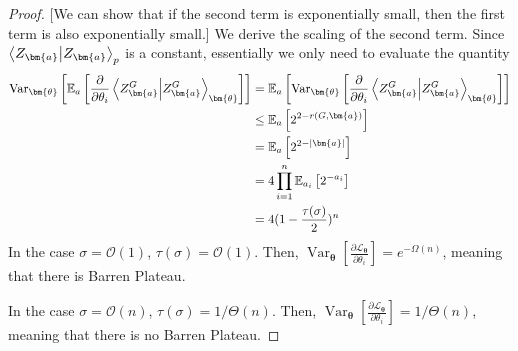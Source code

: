 \documentclass[a4paper,onecolumn,notitlepage,nofootinbib,longbibliography,superscriptaddress, floatfix, pra, aps, 10pt]{revtex4-2}
\newcommand{\cmt}[1]{{\color{blue}[#1]}}
\newcommand{\vttheta}{{\bm{\theta}}}
\newcommand{\vta}{{\bm{a}}}
\begin{document}
\begin{proof}
\cmt{We can show that if the second term is exponentially small, then the first term is also exponentially small.}
We derive the scaling of the second term. Since $\braket{Z_\vta}_p$ is a constant, essentially we only need to evaluate the quantity \begin{align}
    \operatorname{Var}_\vttheta \left[\mathbb{E}_a\left[\frac{\partial}{\partial \theta_i} \braket{Z^G_\vta}_\vttheta \right]
 \right] &= \mathbb{E}_a\left[\operatorname{Var}_\vttheta \left[\frac{\partial}{\partial \theta_i} \braket{Z^G_\vta}_\vttheta \right]
 \right]  \label{variance 1: eq}\\
 & \leq \mathbb{E}_a \left[2^{2-r(G,\vta)} \right] \label{variance 2: eq}\\
 & = \mathbb{E}_a \left[2^{2-\abs{\vta}} \right] \\
 & = 4 \prod_{i=1}^{n} \mathbb{E}_{a_i}\left[2^{-a_i} \right] \\
 & = 4 (1-\frac{\tau(\sigma)}{2})^n
\end{align}
In the case $\sigma = \mathcal{O}(1)$, $\tau(\sigma) = \mathcal{O}(1)$. Then, $\operatorname{Var}_\vttheta \left[\frac{\partial \mathcal{L}_\vttheta}{\partial \theta_i}\right] = e^{-\Omega(n)}$, meaning that there is Barren Plateau.

In the case $\sigma = \mathcal{O}(n)$, $\tau(\sigma) = 1/\Theta(n)$. Then, $\operatorname{Var}_\vttheta \left[\frac{\partial \mathcal{L}_\vttheta}{\partial \theta_i}\right] = 1/\Theta(n)$, meaning that there is no Barren Plateau.
\end{proof}
\end{document}
